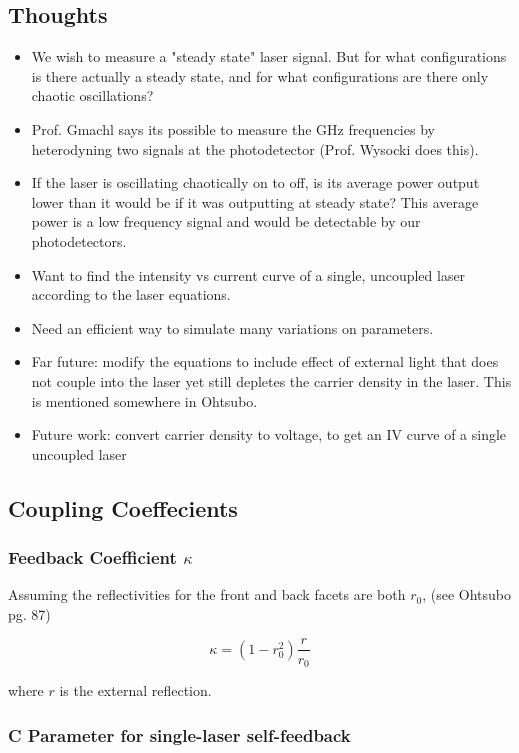 \documentclass[11pt,letterpaper]{article}
\begin{document}
\subsection{Thoughts}
\begin{itemize}
    \item We wish to measure a "steady state" laser signal. But for what configurations is there actually a steady state, and for what configurations are there only chaotic oscillations?
    \item Prof. Gmachl says its possible to measure the GHz frequencies by heterodyning two signals at the photodetector (Prof. Wysocki does this).
    \item If the laser is oscillating chaotically on to off, is its average power output lower than it would be if it was outputting at steady state? This average power is a low frequency signal and would be detectable by our photodetectors.
    \item Want to find the intensity vs current curve of a single, uncoupled laser according to the laser equations.
    \item Need an efficient way to simulate many variations on parameters.
    \item Far future: modify the equations to include effect of external light that does not couple into the laser yet still depletes the carrier density in the laser. This is mentioned somewhere in Ohtsubo.
    \item Future work: convert carrier density to voltage, to get an IV curve of a single uncoupled laser
\end{itemize}

\subsection{Coupling Coeffecients}
\subsubsection{Feedback Coefficient $\kappa$}

Assuming the reflectivities for the front and back facets are both $r_0$, (see Ohtsubo pg. 87)

\begin{equation}
\kappa = (1-r_0^2)\frac{r}{r_0}
\end{equation}

where $r$ is the external reflection.

\subsubsection{C Parameter for single-laser self-feedback}
\end{document}
